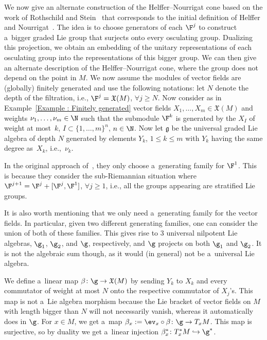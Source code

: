 We now give an alternate construction of the Helffer--Nourrigat cone based on the work of Rothschild and Stein~\cite{RothschildStein} that corresponds to the initial definition of Helffer and Nourrigat~\cite{HelfferNourrigatPaper}. The idea is to choose generators of each $\F^j$ to construct a~bigger graded Lie group that surjects onto every osculating group. Dualizing this projection, we obtain an embedding of the unitary representations of each osculating group into the representations of this bigger group. We can then give an alternate description of the Helffer--Nourrigat cone, where the group does not depend on the point in $M$. We now assume the modules of vector fields are (globally) finitely generated and use the following notations: let $N$ denote the depth of the filtration, i.e., $\F^j = \mathfrak{X}(M)$, $\forall j \geq N$. Now consider as in Example~\ref{Example : Finitely generated} vector fields $X_1,\dots,X_m \in \mathfrak{X}(M)$ and weights $\nu_1,\dots,\nu_m \in \N$ such that the submodule $\F^k$ is generated by the $X_I$ of weight at most~$k$, $I \subset \{1,\dots,m\}^n$, $n\in \N$. Now let $\mathfrak{g}$ be the universal graded Lie algebra of depth $N$ generated by elements $Y_k$, $1\leq k \leq m $ with $Y_k$ having the same degree as~$X_k$, i.e.,~$\nu_k$.

\begin{rem}
 In the original approach of~\cite{RothschildStein}, they only choose a~generating family for $\F^1$. This is because they consider the sub-Riemannian situation where $\F^{j+1} = \F^j + [\F^j,\F^1]$, $\forall j \geq 1$, i.e., all the groups appearing are stratified Lie groups.

 It is also worth mentioning that we only need a~generating family for the vector fields. In particular, given two different generating families, one can consider the union of both of these families. This gives rise to 3 universal nilpotent Lie algebras, $\g_1$, $\g_2$, and $\g$, respectively, and $\g$ projects on both $\g_1$ and $\g_2$. It is not the algebraic sum though, as it would (in general) not be a~universal Lie algebra.
\end{rem}

We define a~linear map $\beta \colon \g \to \mathfrak{X}(M)$ by sending $Y_k$ to $X_k$ and every commutator of weight at most $N$ onto the respective commutator of $X_j$'s. This map is not a~Lie algebra morphism because the Lie bracket of vector fields on $M$ with length bigger than $N$ will not necessarily vanish, whereas it automatically does in $\g$.
For $x \in M$, we get a~map $\beta_x := \ev_x \circ \beta \colon \g \to T_xM$. This map is surjective, so by duality we get a~linear injection $\beta_x^* \colon T^*_xM \hookrightarrow \g^*$.

